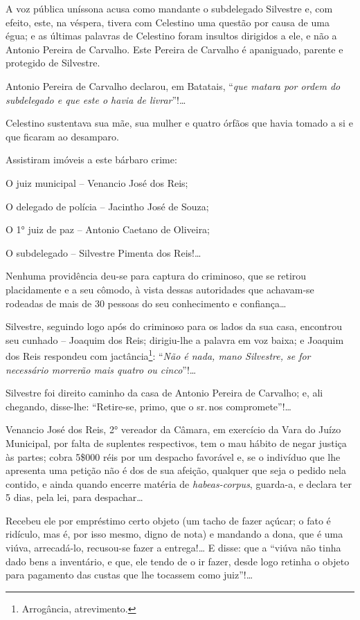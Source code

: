 A voz pública uníssona acusa como mandante o subdelegado Silvestre e,
com efeito, este, na véspera, tivera com Celestino uma questão por causa
de uma égua; e as últimas palavras de Celestino foram insultos dirigidos
a ele, e não a Antonio Pereira de Carvalho. Este Pereira de Carvalho é
apaniguado, parente e protegido de Silvestre.

Antonio Pereira de Carvalho declarou, em Batatais, ``\emph{que matara por
ordem do subdelegado e que este o havia de livrar}''!\ldots{}

Celestino sustentava sua mãe, sua mulher e quatro órfãos que havia
tomado a si e que ficaram ao desamparo.

Assistiram imóveis a este bárbaro crime:

O juiz municipal -- Venancio José dos Reis;

O delegado de polícia -- Jacintho José de Souza;

O 1° juiz de paz -- Antonio Caetano de Oliveira;

O subdelegado -- Silvestre Pimenta dos Reis!\ldots{}

Nenhuma providência deu-se para captura do criminoso, que se retirou
placidamente e a seu cômodo, à vista dessas autoridades que achavam-se
rodeadas de mais de 30 pessoas do seu conhecimento e confiança\ldots{}

Silvestre, seguindo logo após do criminoso para os lados da sua casa,
encontrou seu cunhado -- Joaquim dos Reis; dirigiu-lhe a palavra em voz
baixa; e Joaquim dos Reis respondeu com jactância\footnote{ Arrogância,
  atrevimento.}: ``\emph{Não é nada, mano Silvestre, se for necessário
morrerão mais quatro ou cinco}''!\ldots{}

Silvestre foi direito caminho da casa de Antonio Pereira de Carvalho; e,
ali chegando, disse-lhe: ``Retire-se, primo, que o sr.\,nos
compromete''!\ldots{}

Venancio José dos Reis, 2° vereador da Câmara, em exercício da Vara do
Juízo Municipal, por falta de suplentes respectivos, tem o mau hábito de
negar justiça às partes; cobra 5\$000 réis por um despacho favorável e,
se o indivíduo que lhe apresenta uma petição não é dos de sua afeição,
qualquer que seja o pedido nela contido, e ainda quando encerre matéria
de \emph{habeas-corpus}, guarda-a, e declara ter 5 dias, pela lei, para
despachar\ldots{}

Recebeu ele por empréstimo certo objeto (um tacho de fazer açúcar; o
fato é ridículo, mas é, por isso mesmo, digno de nota) e mandando a
dona, que é uma viúva, arrecadá-lo, recusou-se fazer a entrega!\ldots{} E
disse: que a ``viúva não tinha dado bens a inventário, e que, ele tendo
de o ir fazer, desde logo retinha o objeto para pagamento das custas que
lhe tocassem como juiz''!\ldots{}


